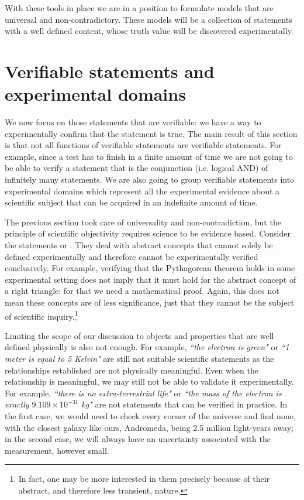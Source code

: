 \documentclass[11pt,letterpaper,fleqn]{memoir} %
\begin{document}
With these tools in place we are in a position to formulate models that are universal and non-contradictory. These models will be a collection of statements with a well defined content, whose truth value will be discovered experimentally.

\section{Verifiable statements and experimental domains}

We now focus on those statements that are verifiable: we have a way to experimentally confirm that the statement is true. The main result of this section is that not all functions of verifiable statements are verifiable statements. For example, since a test has to finish in a finite amount of time we are not going to be able to verify a statement that is the conjunction (i.e. logical AND) of infinitely many statements. We are also going to group verifiable statements into experimental domains which represent all the experimental evidence about a scientific subject that can be acquired in an indefinite amount of time.

The previous section took care of universality and non-contradiction, but the principle of scientific objectivity requires science to be evidence based. Consider the statements  or . They deal with abstract concepts that cannot solely be defined experimentally and therefore cannot be experimentally verified conclusively. For example, verifying that the Pythagorean theorem holds in some experimental setting does not imply that it must hold for the abstract concept of a right triangle: for that we need a mathematical proof. Again, this does not mean these concepts are of less significance, just that they cannot be the subject of scientific inquiry.\footnote{In fact, one may be more interested in them precisely because of their abstract, and therefore less transient, nature.}

Limiting the scope of our discussion to objects and properties that are well defined physically is also not enough. For example, \emph{``the electron is green"} or \emph{``1 meter is equal to 5 Kelvin"} are still not suitable scientific statements as the relationships established are not physically meaningful. Even when the relationship is meaningful, we may still not be able to validate it experimentally. For example, \emph{``there is no extra-terrestrial life"} or \emph{``the mass of the electron is exactly $9.109 \times 10^{-31}$ kg"} are not statements that can be verified in practice. In the first case, we would need to check every corner of the universe and find none, with the closest galaxy like ours, Andromeda, being 2.5 million light-years away; in the second case, we will always have an uncertainty associated with the measurement, however small.
\end{document}
